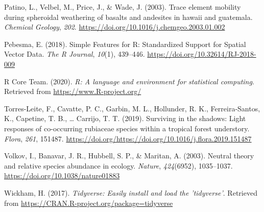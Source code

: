 \documentclass[11pt,]{article}
\begin{document}
\hypertarget{ref-patino_weathering}{}
Patino, L., Velbel, M., Price, J., \& Wade, J. (2003). Trace element
mobility during spheroidal weathering of basalts and andesites in hawaii
and guatemala. \emph{Chemical Geology}, \emph{202}.
\url{https://doi.org/10.1016/j.chemgeo.2003.01.002}

\hypertarget{ref-cita_sf}{}
Pebesma, E. (2018). Simple Features for R: Standardized Support for
Spatial Vector Data. \emph{The R Journal}, \emph{10}(1), 439--446.
\url{https://doi.org/10.32614/RJ-2018-009}

\hypertarget{ref-cita_r}{}
R Core Team. (2020). \emph{R: A language and environment for statistical
computing}. Retrieved from \url{https://www.R-project.org/}

\hypertarget{ref-TORRESLEITE2019151487}{}
Torres-Leite, F., Cavatte, P. C., Garbin, M. L., Hollunder, R. K.,
Ferreira-Santos, K., Capetine, T. B., \ldots{} Carrijo, T. T. (2019).
Surviving in the shadows: Light responses of co-occurring rubiaceae
species within a tropical forest understory. \emph{Flora}, \emph{261},
151487.
\url{https://doi.org/https://doi.org/10.1016/j.flora.2019.151487}

\hypertarget{ref-Volkov_2003}{}
Volkov, I., Banavar, J. R., Hubbell, S. P., \& Maritan, A. (2003).
Neutral theory and relative species abundance in ecology. \emph{Nature},
\emph{424}(6952), 1035--1037. \url{https://doi.org/10.1038/nature01883}

\hypertarget{ref-cita_tidyverse}{}
Wickham, H. (2017). \emph{Tidyverse: Easily install and load the
'tidyverse'}. Retrieved from
\url{https://CRAN.R-project.org/package=tidyverse}




\newpage
\singlespacing 
\end{document}
